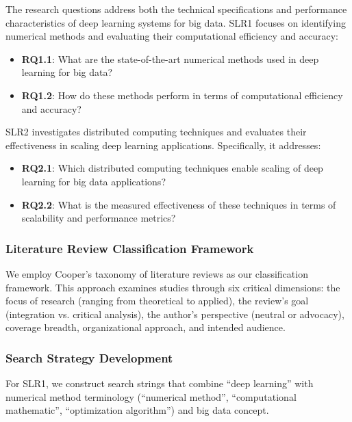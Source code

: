 \documentclass[acmsmall]{acmart}
\begin{document}
The research questions address both the technical specifications and performance characteristics of deep learning systems for big data. SLR1 focuses on identifying numerical methods and evaluating their computational efficiency and accuracy:

\begin{itemize}
    \item \textbf{RQ1.1}: What are the state-of-the-art numerical methods used in deep learning for big data?
    \item \textbf{RQ1.2}: How do these methods perform in terms of computational efficiency and accuracy?
\end{itemize}

SLR2 investigates distributed computing techniques and evaluates their effectiveness in scaling deep learning applications. Specifically, it addresses:

\begin{itemize}
    \item \textbf{RQ2.1}: Which distributed computing techniques enable scaling of deep learning for big data applications?
    \item \textbf{RQ2.2}: What is the measured effectiveness of these techniques in terms of scalability and performance metrics?
\end{itemize}

\subsubsection{Literature Review Classification Framework}\label{subsubsec:phase-1-planning-and-protocol-development:literature-review-classification-framework}
We employ Cooper's taxonomy of literature reviews \citep{cooper1988organizing} as our classification framework. This approach examines studies through six critical dimensions: the focus of research (ranging from theoretical to applied), the review's goal (integration vs. critical analysis), the author's perspective (neutral or advocacy), coverage breadth, organizational approach, and intended audience.



\subsubsection{Search Strategy Development}\label{subsubsec:phase-1-planning-and-protocol-development:search-strategy-development}
For SLR1, we construct search strings that combine ``deep learning'' with numerical method terminology (``numerical method'', ``computational mathematic'', ``optimization algorithm'') and big data concept.
\end{document}
